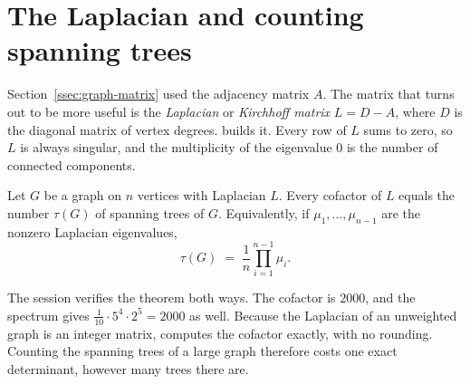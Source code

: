 
\section{The Laplacian and counting spanning trees}
\label{sec:graphs-laplacian}

Section~\ref{ssec:graph-matrix} used the adjacency matrix \(A\). The matrix that
turns out to be more useful is the \emph{Laplacian} or \emph{Kirchhoff matrix}
\(L = D - A\), where \(D\) is the diagonal matrix of vertex
degrees. 
builds it. Every row of \(L\) sums to zero, so \(L\) is always singular, and the
multiplicity of the eigenvalue \(0\) is the number of connected components.

\begin{codepairs}
\end{codepairs}

\begin{theorem}
Let \(G\) be a graph on \(n\) vertices with Laplacian \(L\). Every cofactor of
\(L\) equals the number \(\tau(G)\) of spanning trees of \(G\). Equivalently, if
\(\mu_1, \dots, \mu_{n-1}\) are the nonzero Laplacian eigenvalues,
\[
  \tau(G) \;=\; \frac{1}{n}\prod_{i=1}^{n-1} \mu_i .
\]
\end{theorem}

The session verifies the theorem both ways. The cofactor is \(2000\), and the
spectrum gives \(\tfrac{1}{10}\cdot 5^4 \cdot 2^5 = 2000\) as well. Because the
Laplacian of an unweighted graph is an integer matrix,  computes the
cofactor exactly, with no rounding. Counting the spanning trees of a
large graph therefore costs one exact determinant, however many trees there
are.

